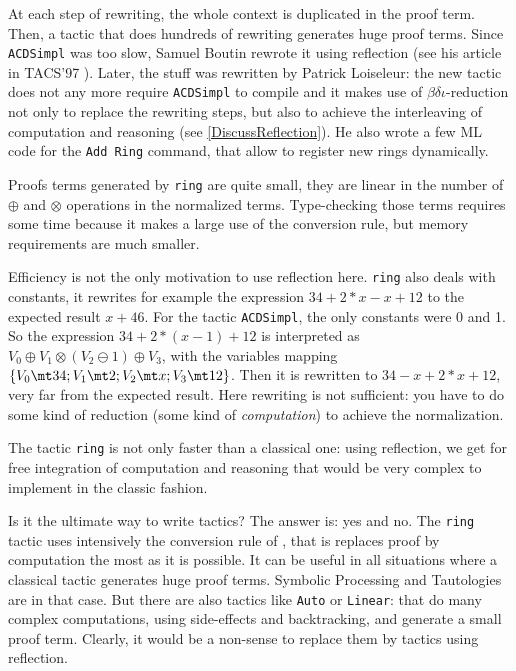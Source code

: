 At each step of rewriting, the whole context is duplicated in the proof
term. Then, a tactic that does hundreds of rewriting generates huge proof
terms. Since \texttt{ACDSimpl} was too slow, Samuel Boutin rewrote it
using reflection (see his article in TACS'97 \cite{Bou97}). Later, the
stuff was rewritten by Patrick
Loiseleur: the new tactic does not any more require \texttt{ACDSimpl}
to compile and it makes use of $\beta\delta\iota$-reduction 
not only to replace the rewriting steps, but also to achieve the
interleaving of computation and 
reasoning (see \ref{DiscussReflection}). He also wrote a
few ML code for the \texttt{Add Ring} command, that allow to register
new rings dynamically.

Proofs terms generated by \texttt{ring} are quite small, they are
linear in the number of $\oplus$ and $\otimes$ operations in the
normalized terms. Type-checking those terms requires some time because it
makes a large use of the conversion rule, but
memory requirements are much smaller. 

\label{DiscussReflection}

Efficiency is not the only motivation to use reflection
here. \texttt{ring} also deals with constants, it rewrites for example the
expression $34 + 2*x -x + 12$ to the expected result $x + 46$. For the
tactic \texttt{ACDSimpl}, the only constants were 0 and 1. So the
expression $34 + 2*(x - 1) + 12$ is interpreted as 
$V_0 \oplus V_1 \otimes (V_2 \ominus 1) \oplus V_3$, 
with the variables mapping 
$\{V_0 \mt 34; V_1 \mt 2; V_2 \mt x; V_3 \mt 12 \}$. Then it is
rewritten to $34 - x + 2*x + 12$, very far from the expected
result. Here rewriting is not sufficient: you have to do some kind of
reduction (some kind of \textit{computation}) to achieve the
normalization.

The tactic \texttt{ring} is not only faster than a classical one:
using reflection, we get for free integration of computation and
reasoning that would be very complex to implement in the classic fashion.

Is it the ultimate way to write tactics? 
The answer is: yes and no. The \texttt{ring} tactic
uses intensively the conversion
rule of \CIC, that is replaces proof by computation the most as it is
possible. It can be useful in all situations where a classical tactic
generates huge proof terms. Symbolic Processing and Tautologies are
in that case. But there are also tactics like \texttt{Auto} or
\texttt{Linear}: that do many complex computations, using side-effects
and backtracking, and generate
 a small proof term. Clearly, it would be a non-sense to
replace them by tactics using reflection.

